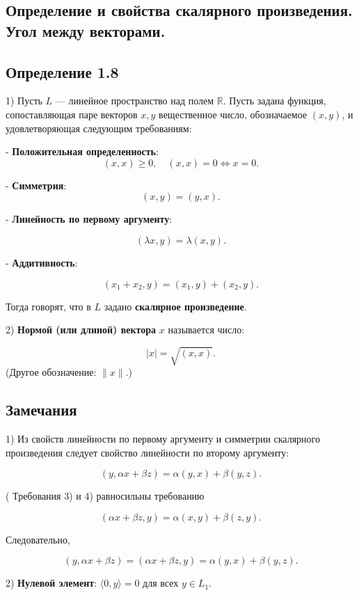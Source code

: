 {
\subsection{Определение и свойства скалярного произведения. Угол между векторами.}
\subsection*{Определение 1.8}

1) Пусть \( L \) — линейное пространство над полем \( \mathbb{R} \). Пусть задана функция, сопоставляющая паре векторов \( x, y \) вещественное число, обозначаемое \( (x, y) \), и удовлетворяющая следующим требованиям:

   - \textbf{Положительная определенность}:
\[
     (x, x) \geq 0, \quad (x, x) = 0 \Leftrightarrow x = 0.
     \]

   - \textbf{Симметрия}:
\[
     (x, y) = (y, x).
     \]

   - \textbf{Линейность по первому аргументу}:
     
\[
     (\lambda x, y) = \lambda (x, y).
     \]

   - \textbf{Аддитивность}:

\[
     (x_1 + x_2, y) = (x_1, y) + (x_2, y).
\]

Тогда говорят, что в \( L \) задано \textbf{скалярное произведение}.

2) \textbf{Нормой (или длиной) вектора} \( x \) называется число:

\[
   |x| = \sqrt{(x, x)}.
\]
(Другое обозначение: \( \|x\| \).)

\subsection*{Замечания}

1) Из свойств линейности по первому аргументу и симметрии скалярного произведения следует свойство линейности по второму аргументу:

\[
( y, \alpha x + \beta z ) = \alpha ( y, x ) + \beta ( y, z ).
\]

( Требования 3) и 4) равносильны требованию 

\[
( \alpha x + \beta z , y ) = \alpha ( x, y ) + \beta ( z, y ).
\]

Следовательно,

\[
( y, \alpha x + \beta z ) = ( \alpha x + \beta z , y ) = \alpha ( y, x ) + \beta ( y, z ).
\]

2) \textbf{Нулевой элемент}: \( \langle 0, y \rangle = 0 \) для всех \( y \in L_1 \).

}
